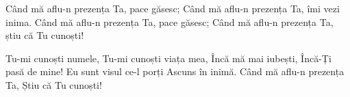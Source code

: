 \beginverse
Când mă aflu-n prezența Ta, pace găsesc;
Când mă aflu-n prezența Ta, îmi vezi inima.
Când mă aflu-n prezența Ta, pace găsesc;
Când mă aflu-n prezența Ta, știu că Tu cunoști!
\endverse

\beginchorus
Tu-mi cunoști numele,
Tu-mi cunoști viața mea,
Încă mă mai iubești,
Încă-Ți pasă de mine!
Eu sunt visul ce-l porți
Ascuns în inimă.
Când mă aflu-n prezența Ta,
Știu că Tu cunoști!
\endchorus
\endsong